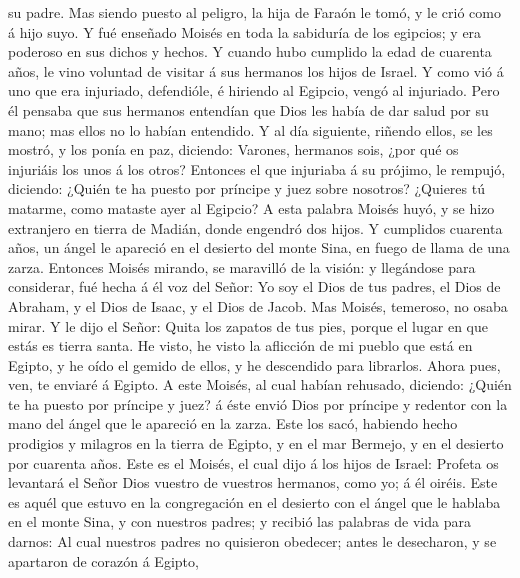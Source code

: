 su padre.  Mas siendo puesto al peligro, la hija de
Faraón le tomó, y le crió como á hijo suyo.  Y fué
enseñado Moisés en toda la sabiduría de los egipcios; y era poderoso en
sus dichos y hechos.  Y cuando hubo cumplido la edad de
cuarenta años, le vino voluntad de visitar á sus hermanos los hijos de
Israel.  Y como vió á uno que era injuriado, defendióle,
é hiriendo al Egipcio, vengó al injuriado.  Pero él
pensaba que sus hermanos entendían que Dios les había de dar salud por
su mano; mas ellos no lo habían entendido.  Y al día
siguiente, riñendo ellos, se les mostró, y los ponía en paz, diciendo:
Varones, hermanos sois, ¿por qué os injuriáis los unos á los otros?
 Entonces el que injuriaba á su prójimo, le rempujó,
diciendo: ¿Quién te ha puesto por príncipe y juez sobre nosotros?
 ¿Quieres tú matarme, como mataste ayer al Egipcio?
 A esta palabra Moisés huyó, y se hizo extranjero en
tierra de Madián, donde engendró dos hijos.  Y cumplidos
cuarenta años, un ángel le apareció en el desierto del monte Sina, en
fuego de llama de una zarza.  Entonces Moisés mirando, se
maravilló de la visión: y llegándose para considerar, fué hecha á él voz
del Señor:  Yo soy el Dios de tus padres, el Dios de
Abraham, y el Dios de Isaac, y el Dios de Jacob. Mas Moisés, temeroso,
no osaba mirar.  Y le dijo el Señor: Quita los zapatos de
tus pies, porque el lugar en que estás es tierra santa. 
He visto, he visto la aflicción de mi pueblo que está en Egipto, y he
oído el gemido de ellos, y he descendido para librarlos. Ahora pues,
ven, te enviaré á Egipto.  A este Moisés, al cual habían
rehusado, diciendo: ¿Quién te ha puesto por príncipe y juez? á éste
envió Dios por príncipe y redentor con la mano del ángel que le apareció
en la zarza.  Este los sacó, habiendo hecho prodigios y
milagros en la tierra de Egipto, y en el mar Bermejo, y en el desierto
por cuarenta años.  Este es el Moisés, el cual dijo á los
hijos de Israel: Profeta os levantará el Señor Dios vuestro de vuestros
hermanos, como yo; á él oiréis.  Este es aquél que estuvo
en la congregación en el desierto con el ángel que le hablaba en el
monte Sina, y con nuestros padres; y recibió las palabras de vida para
darnos:  Al cual nuestros padres no quisieron obedecer;
antes le desecharon, y se apartaron de corazón á Egipto, 

